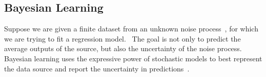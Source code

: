 \subsection{Bayesian Learning}
\label{ssec:bayesianLearning}

Suppose we are given a finite dataset from an unknown noise process~, for which
we are trying to fit a regression model.~
%
The goal is not only to predict the average outputs of the source, but also
the uncertainty of the noise process.
%
Bayesian learning uses the expressive power of stochastic models to best
represent the data source and report the uncertainty in
predictions~\cite{bishop2006pattern}.


